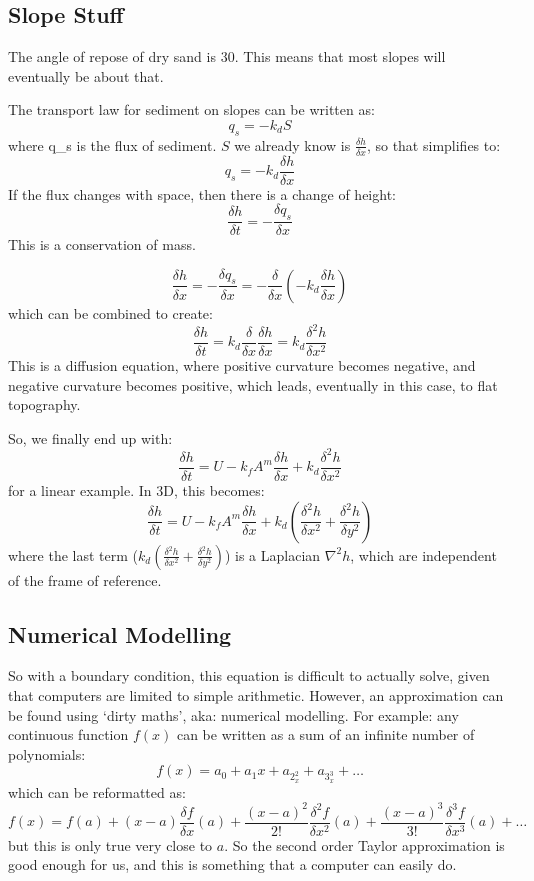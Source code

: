 \subsection{Slope Stuff}
The angle of repose of dry sand is $30$\textdegree. This means that most slopes will eventually be about that.

The transport law for sediment on slopes can be written as:
\[
q_s = -k_d S
\]
where q_s is the flux of sediment.
$S$ we already know is $\frac{\delta h}{\delta x}$, so that simplifies to:
\[
q_s = -k_d \frac{\delta h}{\delta x}
\]
If the flux changes with space, then there is a change of height:
\[
\frac{\delta h}{\delta t} = -\frac{\delta q_s}{\delta x}
\]
This is a conservation of mass.

\[
\frac{\delta h}{\delta x} = -\frac{\delta q_s}{\delta x} = -\frac{\delta}{\delta x} \left(-k_d \frac{\delta h}{\delta x} \right)
\]
which can be combined to create:
\[
\frac{\delta h}{\delta t} = k_d \frac{\delta}{\delta x} \frac{\delta h}{\delta x} = k_d \frac{\delta^2 h}{\delta x^2}
\]
This is a diffusion equation, where positive curvature becomes negative, and negative curvature becomes positive, which leads, eventually in this case, to flat topography.

So, we finally end up with:
\[
\frac{\delta h}{\delta t} = U- k_f A^m \frac{\delta h}{\delta x} + k_d
 \frac{\delta^2 h}{\delta x^2}
\]
for a linear example. In 3D, this becomes:
\[
\frac{\delta h}{\delta t} = U- k_f A^m \frac{\delta h}{\delta x} + k_d \left(
 \frac{\delta^2 h}{\delta x^2} + \frac{\delta^2 h}{\delta y^2} \right)
\]
where the last term ($k_d \left(
 \frac{\delta^2 h}{\delta x^2} + \frac{\delta^2 h}{\delta y^2} \right)$) is a Laplacian $\nabla^2 h$, which are independent of the frame of reference.

\subsection{Numerical Modelling}
So with a boundary condition, this equation is difficult to actually solve, given that computers are limited to simple arithmetic. However, an approximation can be found using `dirty maths', aka: numerical modelling. For example: any continuous function $f(x)$ can be written as a sum of an infinite number of polynomials:
\[
f(x) = a_0 + a_1x + a_2_x^2 + a_3_x^3 + \ldots
\] which can be reformatted as:
\[
f(x) = f(a) + (x-a)\frac{\delta f}{\delta x}(a) + \frac{(x-a)^2}{2!} \frac{\delta^2 f}{\delta x^2}(a) + \frac{(x-a)^3}{3!} \frac{\delta^3 f}{\delta x^3}(a) + \ldots
\]
but this is only true very close to $a$. So the second order Taylor approximation is good enough for us, and this is something that a computer can easily do.

